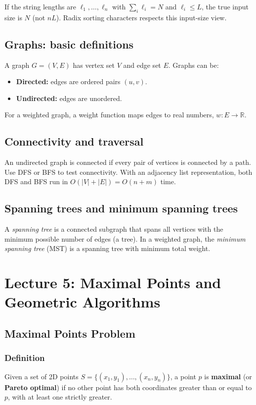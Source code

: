\documentclass[11pt]{article}
\begin{document}
{If the string lengths are $\ell_1, \ldots, \ell_n$ with $\sum_i \ell_i = N$ and $\ell_i \le L$,
the true input size is $N$ (not $nL$). Radix sorting characters respects this input-size view.

\subsection*{Graphs: basic definitions}
A graph $G=(V,E)$ has vertex set $V$ and edge set $E$. Graphs can be:
\begin{itemize}
\item \textbf{Directed:} edges are ordered pairs $(u,v)$.
\item \textbf{Undirected:} edges are unordered.
\end{itemize}
For a weighted graph, a weight function maps edges to real numbers, $w:E \to \mathbb{R}$.

\subsection*{Connectivity and traversal}
An undirected graph is connected if every pair of vertices is connected by a path. Use DFS or BFS
to test connectivity. With an adjacency list representation, both DFS and BFS run in
$O(|V| + |E|) = O(n + m)$ time.

\subsection*{Spanning trees and minimum spanning trees}
A \emph{spanning tree} is a connected subgraph that spans all vertices with the minimum possible
number of edges (a tree). In a weighted graph, the \emph{minimum spanning tree} (MST) is a spanning
tree with minimum total weight.

\section{Lecture 5: Maximal Points and Geometric Algorithms}

\subsection*{Maximal Points Problem}

\subsubsection*{Definition}
Given a set of 2D points $S = \{(x_1, y_1), \ldots, (x_n, y_n)\}$, a point $p$ is \textbf{maximal} (or \textbf{Pareto optimal}) if no other point has both coordinates greater than or equal to $p$, with at least one strictly greater.

}
\end{document}
